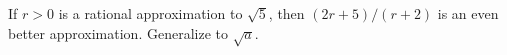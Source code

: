 If $r > 0$ is a rational approximation to $\sqrt{5}$, then $(2r + 5)/(r + 2)$ is an even better approximation. Generalize to $\sqrt{a}$.
